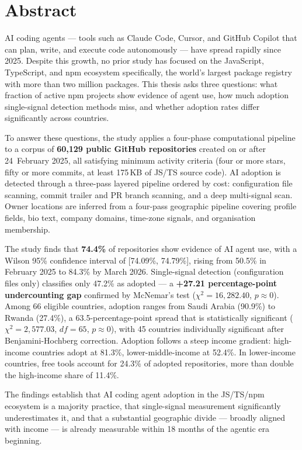 \documentclass[12pt, a4paper]{book}%
\begin{document}
\chapter*{Abstract}

\label{chap:abstract}

AI coding agents --- tools such as Claude Code, Cursor, and GitHub Copilot that can plan, write, and execute code autonomously --- have spread rapidly since 2025. Despite this growth, no prior study has focused on the JavaScript, TypeScript, and npm ecosystem specifically, the world's largest package registry with more than two million packages. This thesis asks three questions: what fraction of active npm projects show evidence of agent use, how much adoption single-signal detection methods miss, and whether adoption rates differ significantly across countries.

To answer these questions, the study applies a four-phase computational pipeline to a corpus of \textbf{60,129 public GitHub repositories} created on or after 24~February 2025, all satisfying minimum activity criteria (four or more stars, fifty or more commits, at least 175\,KB of JS/TS source code). AI adoption is detected through a three-pass layered pipeline ordered by cost: configuration file scanning, commit trailer and PR branch scanning, and a deep multi-signal scan. Owner locations are inferred from a four-pass geographic pipeline covering profile fields, bio text, company domains, time-zone signals, and organisation membership.

The study finds that \textbf{74.4\%} of repositories show evidence of AI agent use, with a Wilson 95\% confidence interval of [74.09\%, 74.79\%], rising from 50.5\% in February 2025 to 84.3\% by March 2026. Single-signal detection (configuration files only) classifies only 47.2\% as adopted --- a \textbf{+27.21 percentage-point undercounting gap} confirmed by McNemar's test ($\chi^2 = 16{,}282.40$, $p \approx 0$). Among 66 eligible countries, adoption ranges from Saudi Arabia (90.9\%) to Rwanda (27.4\%), a 63.5-percentage-point spread that is statistically significant ($\chi^2 = 2{,}577.03$, $df = 65$, $p \approx 0$), with 45 countries individually significant after Benjamini-Hochberg correction. Adoption follows a steep income gradient: high-income countries adopt at 81.3\%, lower-middle-income at 52.4\%. In lower-income countries, free tools account for 24.3\% of adopted repositories, more than double the high-income share of 11.4\%.

The findings establish that AI coding agent adoption in the JS/TS/npm ecosystem is a majority practice, that single-signal measurement significantly underestimates it, and that a substantial geographic divide --- broadly aligned with income --- is already measurable within 18 months of the agentic era beginning.
\end{document}
